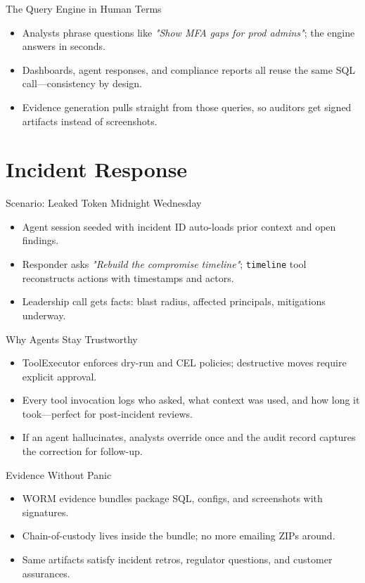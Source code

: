 \documentclass[aspectratio=169]{beamer}
\begin{document}
\begin{frame}{The Query Engine in Human Terms}
  \begin{itemize}
    \item Analysts phrase questions like \emph{"Show MFA gaps for prod admins"}; the engine answers in seconds.
    \item Dashboards, agent responses, and compliance reports all reuse the same SQL call—consistency by design.
    \item Evidence generation pulls straight from those queries, so auditors get signed artifacts instead of screenshots.
  \end{itemize}
\end{frame}

\section{Incident Response}

\begin{frame}{Scenario: Leaked Token Midnight Wednesday}
  \begin{itemize}
    \item Agent session seeded with incident ID auto-loads prior context and open findings.
    \item Responder asks \emph{"Rebuild the compromise timeline"}; \texttt{timeline} tool reconstructs actions with timestamps and actors.
    \item Leadership call gets facts: blast radius, affected principals, mitigations underway.
  \end{itemize}
\end{frame}

\begin{frame}{Why Agents Stay Trustworthy}
  \begin{itemize}
    \item ToolExecutor enforces dry-run and CEL policies; destructive moves require explicit approval.
    \item Every tool invocation logs who asked, what context was used, and how long it took—perfect for post-incident reviews.
    \item If an agent hallucinates, analysts override once and the audit record captures the correction for follow-up.
  \end{itemize}
\end{frame}

\begin{frame}{Evidence Without Panic}
  \begin{itemize}
    \item WORM evidence bundles package SQL, configs, and screenshots with signatures.
    \item Chain-of-custody lives inside the bundle; no more emailing ZIPs around.
    \item Same artifacts satisfy incident retros, regulator questions, and customer assurances.
  \end{itemize}
\end{frame}
\end{document}
